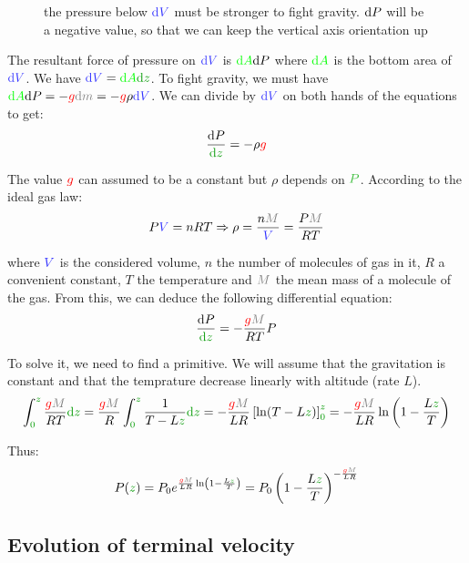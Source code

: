 \begin{figure}[H]
\centering
{}
\caption{
	the pressure below $\vol{\d V}$ must be stronger to fight
	gravity. $\mathrm{d} P$ will be a negative value, so that we can keep
	the vertical axis orientation up
}
\end{figure}

The resultant force of pressure on $\vol{\d V}$ is $\textcolor{green}{\mathrm{d} A} \mathrm{d} P$
where $\textcolor{green}{\mathrm{d} A}$ is the bottom area of $\vol{\d V}$. We have $\vol{\d
V} = \area{\d A} \dist{\d z}$. To fight gravity, we must have $\area{\d A}
\d P = - \accel{g} \mass{\dm} = - \accel{g} \rho \vol{\d V}$. We
can divide by $\vol{\d V}$ on both hands of the equations to get:
\[
\frac {\d P} {\dist{\d z}} = - \rho \accel{g}
\]

The value $\textcolor{red}{g}$ can assumed to be a constant but $\rho$ depends
on $\posit{P}$. According to the ideal gas law:
\[
P\vol{V} = n RT
\Rightarrow
\rho
= \frac {n {\mass{M}}} {\vol{V}}
= \frac {P {\mass{M}}} {RT}
\]

where $\vol{V}$ is the considered volume, $n$ the number of molecules of
gas in it, $R$ a convenient constant, $T$ the temperature and $\mass{M}$
the mean mass of a molecule of the gas. From this, we can deduce the
following differential equation:
\[
\frac {\d P} {\dist{\d z}} = - \frac {\accel{g} \mass{M}} {RT} P
\]

To solve it, we need to find a primitive. We will assume that the
gravitation is constant and that the temprature decrease linearly with
altitude (rate $L$).
\[
\int_{\dist{0}}^{\dist{z}} \frac {\accel{g} \mass{M}} {RT} \dist{\d z}
= \frac {\accel{g} \mass{M}} R
  \int_{\dist{0}}^{\dist{z}} \frac 1 {T - L\dist{z}} \dist{\d z}
= - \frac {\accel{g} \mass{M}} {LR}
  \left[ \ln (T-L\dist{z}) \right]_{\dist{0}}^{\dist{z}}
= - \frac {\accel{g} \mass{M}} {LR}
  \ln \left(1 - \frac {L\dist{z}} {T}\right)
\]

Thus:
\[
P(\dist{z})
= P_0 e^{\frac {\accel{g} \mass{M}} {LR} \ln \left(1 - \frac {L\dist{z}} {T}\right)}
= P_0 \left(1 - \frac {L\dist{z}} {T}\right)^{- \frac {\accel{g} \mass{M}} {LR}}
\]


\subsection{Evolution of terminal velocity}

